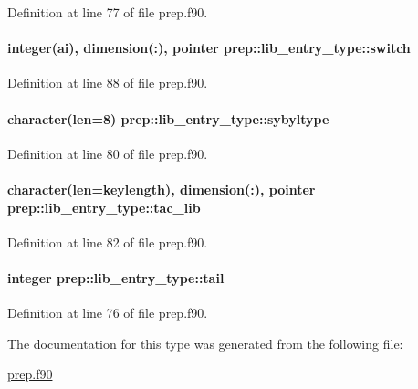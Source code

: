 Definition at line 77 of file prep.\-f90.

\hypertarget{structprep_1_1lib__entry__type_a1d0f6d127268316ea2593822bb051da1}{
\paragraph[{switch}]{\setlength{\rightskip}{0pt plus 5cm}integer(ai), dimension(\-:), pointer prep\-::lib\-\_\-entry\-\_\-type\-::switch}}\label{structprep_1_1lib__entry__type_a1d0f6d127268316ea2593822bb051da1}


Definition at line 88 of file prep.\-f90.

\hypertarget{structprep_1_1lib__entry__type_a9bc4058cdcea1d6db8d48b8bc1db899c}{
\paragraph[{sybyltype}]{\setlength{\rightskip}{0pt plus 5cm}character(len=8) prep\-::lib\-\_\-entry\-\_\-type\-::sybyltype}}\label{structprep_1_1lib__entry__type_a9bc4058cdcea1d6db8d48b8bc1db899c}


Definition at line 80 of file prep.\-f90.

\hypertarget{structprep_1_1lib__entry__type_a22e7ec4e4acf6972efa3afc742bad730}{
\paragraph[{tac\-\_\-lib}]{\setlength{\rightskip}{0pt plus 5cm}character(len=keylength), dimension(\-:), pointer prep\-::lib\-\_\-entry\-\_\-type\-::tac\-\_\-lib}}\label{structprep_1_1lib__entry__type_a22e7ec4e4acf6972efa3afc742bad730}


Definition at line 82 of file prep.\-f90.

\hypertarget{structprep_1_1lib__entry__type_ac24686e331c11448862c335012b45734}{
\paragraph[{tail}]{\setlength{\rightskip}{0pt plus 5cm}integer prep\-::lib\-\_\-entry\-\_\-type\-::tail}}\label{structprep_1_1lib__entry__type_ac24686e331c11448862c335012b45734}


Definition at line 76 of file prep.\-f90.



The documentation for this type was generated from the following file\-:\begin{DoxyCompactItemize}
\item 
\hyperlink{prep_8f90}{prep.\-f90}\end{DoxyCompactItemize}
